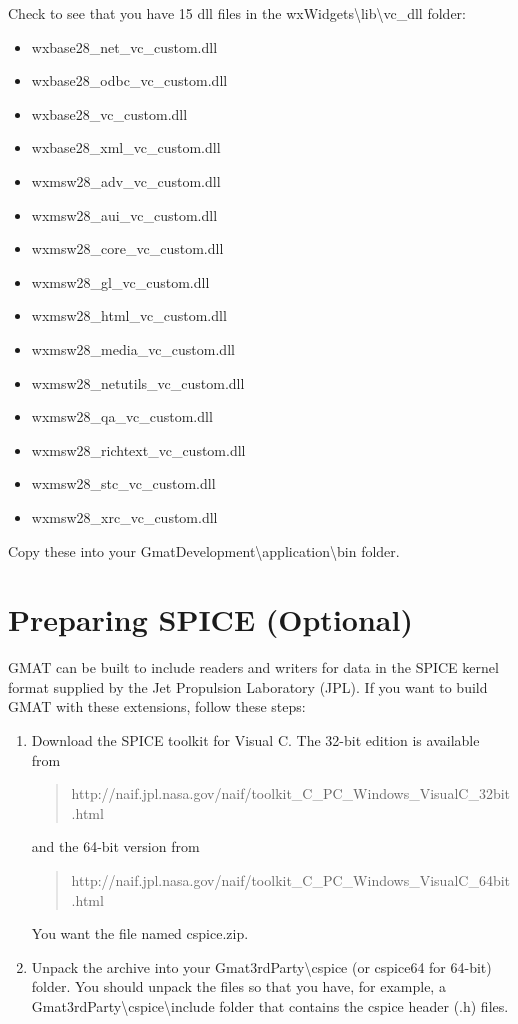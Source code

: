 \documentclass[letterpaper,10pt]{article}%
\begin{document}
\noindent Check to see that you have 15 dll files in the wxWidgets\textbackslash lib\textbackslash vc\_dll folder:
{\begin{itemize}\setlength{\itemsep}{0pt}
\item wxbase28\_net\_vc\_custom.dll
\item wxbase28\_odbc\_vc\_custom.dll
\item wxbase28\_vc\_custom.dll
\item wxbase28\_xml\_vc\_custom.dll
\item wxmsw28\_adv\_vc\_custom.dll
\item wxmsw28\_aui\_vc\_custom.dll
\item wxmsw28\_core\_vc\_custom.dll
\item wxmsw28\_gl\_vc\_custom.dll
\item wxmsw28\_html\_vc\_custom.dll
\item wxmsw28\_media\_vc\_custom.dll
\item wxmsw28\_netutils\_vc\_custom.dll
\item wxmsw28\_qa\_vc\_custom.dll
\item wxmsw28\_richtext\_vc\_custom.dll
\item wxmsw28\_stc\_vc\_custom.dll
\item wxmsw28\_xrc\_vc\_custom.dll
\end{itemize}}

\noindent Copy these into your GmatDevelopment\textbackslash application\textbackslash bin folder.

\section{Preparing SPICE (Optional)}

GMAT can be built to include readers and writers for data in the SPICE kernel format supplied by the Jet Propulsion Laboratory (JPL).  If you want to build GMAT with these extensions, follow these steps:

\begin{enumerate}
\item Download the SPICE toolkit for Visual C.  The 32-bit edition is available from
\begin{quote}
http://naif.jpl.nasa.gov/naif/toolkit\_C\_PC\_Windows\_VisualC\_32bit.html
\end{quote}
\noindent and the 64-bit version from
\begin{quote}
http://naif.jpl.nasa.gov/naif/toolkit\_C\_PC\_Windows\_VisualC\_64bit.html
\end{quote}
\noindent You want the file named cspice.zip.
\item Unpack the archive into your Gmat3rdParty\textbackslash cspice (or cspice64 for 64-bit) folder.  You should unpack the files so that you have, for example, a Gmat3rdParty\textbackslash cspice\textbackslash include folder that contains the cspice header (.h) files.
\end{enumerate}
\end{document}
